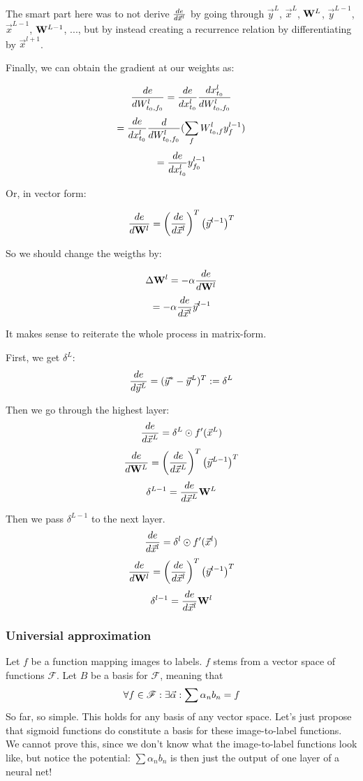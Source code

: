 The smart part here was to not derive $  \frac{ \mathop{de} }{ \mathop{d\vec{x}^l} }  $ by going through $\vec{y}^L$, $\vec{x}^L$, $\mathbf{W}^L$, $\vec{y}^{L-1}$, $\vec{x}^{L-1}$, $\mathbf{W}^{L-1}$, ..., but by instead creating a recurrence relation by differentiating by $\vec{x}^{l+1}$.

Finally, we can obtain the gradient at our weights as: 

$$  \frac{ \mathop{de} }{ \mathop{dW_{t_0, f_0}^l} }  =  \frac{ \mathop{de} }{ \mathop{dx_{t_0}^l} }   \frac{ \mathop{dx_{t_0}^l} }{ \mathop{dW_{t_0, f_0}^l} }    $$
$$                              =  \frac{ \mathop{de} }{ \mathop{dx_{t_0}^l} }   \frac{ \mathop{d} }{ \mathop{dW_{t_0, f_0}^l} }  ( \sum_f W_{t_0, f}^l y_f^{l-1} ) $$
$$                              =  \frac{ \mathop{de} }{ \mathop{dx_{t_0}^l} }  y_{f_0}^{l-1} $$

Or, in vector form: 

$$  \frac{ \mathop{de} }{ \mathop{d\mathbf{W}^l} }  = \left(  \frac{ \mathop{de} }{ \mathop{d\vec{x}^l} }  \right)^T  \left( \vec{y}^{l-1} \right)^T $$ 

So we should change the weigths by: 

$$ \Delta \mathbf{W}^l = - \alpha  \frac{ \mathop{de} }{ \mathop{d\mathbf{W}^l} }  $$
$$ = - \alpha  \frac{ \mathop{de} }{ \mathop{d\vec{x}^l} }  \vec{y}^{l-1} $$


It makes sense to reiterate the whole process in matrix-form. 

First, we  get $\delta^L$:
$$  \frac{ \mathop{de} }{ \mathop{d\vec{y}^L} }  = (\vec{y}^* - \vec{y}^L)^T := \delta^L $$ 

Then we go through the highest layer:
$$  \frac{ \mathop{de} }{ \mathop{d\vec{x}^L} }  = \delta^L \odot f'(\vec{x}^L)  $$
$$  \frac{ \mathop{de} }{ \mathop{d\mathbf{W}^L} }  = \left(  \frac{ \mathop{de} }{ \mathop{d\vec{x}^L} }  \right)^T \left( \vec{y}^{L-1} \right)^T $$
$$ \delta^{L-1} =  \frac{ \mathop{de} }{ \mathop{d\vec{x}^L} }  \mathbf{W}^L $$

Then we pass $\delta^{L-1}$ to the next layer. 
$$  \frac{ \mathop{de} }{ \mathop{d\vec{x}^l} }  = \delta^l \odot f'(\vec{x}^l)  $$
$$  \frac{ \mathop{de} }{ \mathop{d\mathbf{W}^l} }  = \left(  \frac{ \mathop{de} }{ \mathop{d\vec{x}^l} }  \right)^T  \left( \vec{y}^{l-1} \right)^T $$
$$ \delta^{l-1} =  \frac{ \mathop{de} }{ \mathop{d\vec{x}^l} }  \mathbf{W}^l $$



\subsubsection{Universial approximation}
Let $f$ be a function mapping images to labels. $f$ stems from a vector space of functions $\mathscr{F}$. Let $B$ be a basis for $\mathscr{F}$, meaning that 
$$ \forall f \in \mathscr{F}: \exists \vec{\alpha}: \sum \alpha_n b_n = f $$
So far, so simple. This holds for any basis of any vector space. Let's just propose that sigmoid functions do constitute a basis for these image-to-label functions. We cannot prove this, since we don't know what the image-to-label functions look like, but notice the potential: 
$ \sum \alpha_n b_n $ is then just the output of one layer of a neural net!

